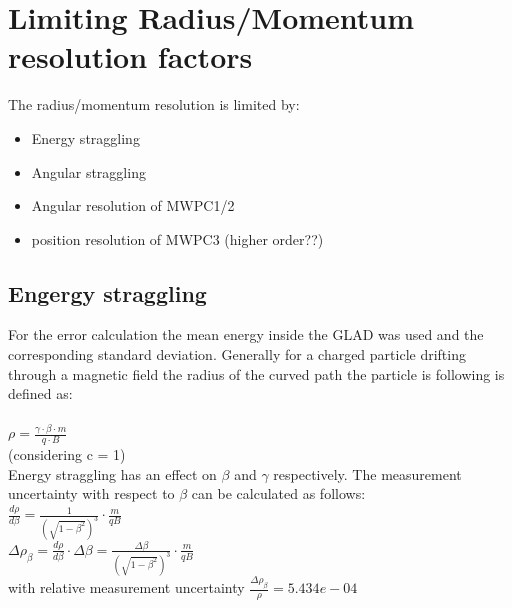 \documentclass[12pt, letterpaper]{article}
\begin{document}
\section{Limiting Radius/Momentum resolution factors}

The radius/momentum resolution is limited by:\\
\begin{itemize}
\item Energy straggling
\item Angular straggling
\item Angular resolution of MWPC1/2
\item position resolution of MWPC3 (higher order??)
\end{itemize}

\subsection{Engergy straggling}

For the error calculation the mean energy inside the GLAD was used and the corresponding standard deviation. 
Generally for a charged particle drifting through a magnetic field the radius of the curved path the particle is following is defined as:\\
\\
$\rho = \frac{\gamma \cdot \beta \cdot m}{q \cdot B}$\\
(considering c = 1)\\
Energy straggling has an effect on $\beta$ and $\gamma$ respectively. The measurement uncertainty with respect to $\beta$ can be calculated as follows:\\
$\frac{d\rho}{d\beta} = \frac{1}{(\sqrt{1-\beta^2})^3}\cdot \frac{m}{qB}$\\
\newline
$\Delta\rho_{\beta} = \frac{d\rho}{d\beta} \cdot \Delta\beta = \frac{\Delta\beta}{(\sqrt{1-\beta^2})^3}\cdot \frac{m}{qB}$\\

with relative measurement uncertainty $\frac{\Delta\rho_{\beta}}{\rho} = 5.434e-04$\\
\end{document}
